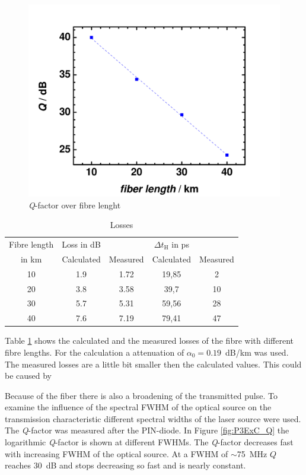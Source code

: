 {\begin{figure}%
\centering
\includegraphics[width=.5\columnwidth]{Grafiken/P3ExB_Q.pdf}%
\caption{\textit{Q}-factor over fibre lenght}%
\label{fig:P3ExB_Q}%
\end{figure}

\begin{table}%
\centering
\caption{Losses}
\begin{tabular}{ccccc}

\toprule
Fibre length & Loss in dB&&$\Delta t_{\mathrm{H}}$ in ps&\\
in km&Calculated&Measured&Calculated&Measured\\
\midrule
10&	1.9&1.72&19,85	&2	\\
20&	3.8&3.58&39,7	&	10\\
30&	5.7&5.31&59,56	&	28\\
40&	7.6&7.19&79,41	&	47\\
\bottomrule 
\end{tabular}
\label{tab:P3ExB_loss}
\end{table}

Table \ref{tab:P3ExB_loss} shows the calculated and the measured losses of the fibre with different fibre lengths. For the calculation a attenuation of $\alpha_0=0.19$~dB/km was used. The measured losses are a little bit smaller then the calculated values. This could be caused by 

Because of the fiber there is also a broadening of the transmitted pulse. To examine the influence of the spectral FWHM of the optical source on the transmission characteristic different spectral widths of the laser source were used. The \textit{Q}-factor was measured after the PIN-diode. In Figure \ref{fig:P3ExC_Q} the logarithmic \textit{Q}-factor is shown at different FWHMs. The \textit{Q}-factor decreases fast with increasing FWHM of the optical source. At a FWHM of $\sim$75~MHz $Q$ reaches 30~dB and stops decreasing so fast and is nearly constant.

}
